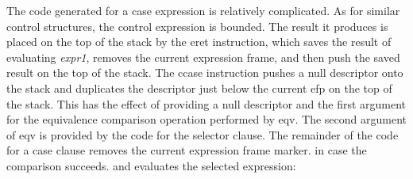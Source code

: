 \begin{noIndex}
The code generated for a case expression is relatively complicated. As
for similar control structures, the control expression is bounded. The
result it produces is placed on the top of the stack by the eret
instruction, which saves the result of evaluating \textit{expr1},
removes the current expression frame, and then push the saved result
on the top of the stack. The ccase instruction pushes a null
descriptor onto the stack and duplicates the descriptor just below the
current efp on the top of the stack. This has the effect of providing
a null descriptor and the first argument for the equivalence
comparison operation performed by eqv. The second argument of eqv is
provided by the code for the selector clause. The remainder of the
code for a case clause removes the current expression frame marker. in
case the comparison succeeds. and evaluates the selected expression:


\end{noIndex}
